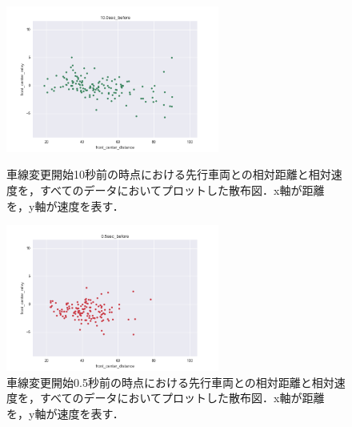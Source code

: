 \begin{figure}[htbp]
 \begin{minipage}{0.5\hsize}
  \begin{center}
    \includegraphics[width=70mm]{fig/10_sec_before.png}
  \end{center}
  \caption{車線変更開始10秒前の時点における先行車両との相対距離と相対速度を，すべてのデータにおいてプロットした散布図．x軸が距離を，y軸が速度を表す．}
  \label{fig:10_sec_before}
 \end{minipage}
 \begin{minipage}{0.5\hsize}
  \begin{center}
    \includegraphics[width=70mm]{fig/05_sec_before.png}
  \end{center}
  \caption{車線変更開始0.5秒前の時点における先行車両との相対距離と相対速度を，すべてのデータにおいてプロットした散布図．x軸が距離を，y軸が速度を表す．}
  \label{fig:05_sec_before}
 \end{minipage}
\end{figure}
